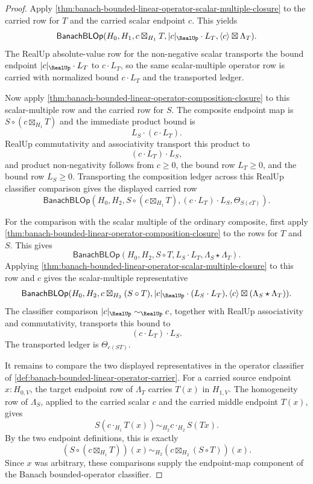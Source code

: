 \begin{proof}
Apply \autoref{thm:banach-bounded-linear-operator-scalar-multiple-closure} to
the carried row for $T$ and the carried scalar endpoint $c$. This yields
$$
\mathsf{BanachBLOp}
(H_0,H_1,c\boxtimes_{H_1}T,|c|_{\RealUp}\cdot L_T,
\langle c\rangle\boxtimes\Lambda_T).
$$
The RealUp absolute-value row for the non-negative scalar transports the bound
endpoint $|c|_{\RealUp}\cdot L_T$ to $c\cdot L_T$, so the same scalar-multiple
operator row is carried with normalized bound $c\cdot L_T$ and the transported
ledger.

Now apply \autoref{thm:banach-bounded-linear-operator-composition-closure} to
this scalar-multiple row and the carried row for $S$. The composite endpoint
map is $S\circ(c\boxtimes_{H_1}T)$ and the immediate product bound is
$$
L_S\cdot(c\cdot L_T).
$$
RealUp commutativity and associativity transport this product to
$$
(c\cdot L_T)\cdot L_S,
$$
and product non-negativity follows from $c\ge0$, the bound row $L_T\ge0$, and
the bound row $L_S\ge0$. Transporting the composition ledger across this
RealUp classifier comparison gives the displayed carried row
$$
\mathsf{BanachBLOp}
(H_0,H_2,S\circ(c\boxtimes_{H_1}T),(c\cdot L_T)\cdot L_S,
\Theta_{S(cT)}).
$$

For the comparison with the scalar multiple of the ordinary composite, first
apply \autoref{thm:banach-bounded-linear-operator-composition-closure} to the
rows for $T$ and $S$. This gives
$$
\mathsf{BanachBLOp}(H_0,H_2,S\circ T,L_S\cdot L_T,
\Lambda_S\star\Lambda_T).
$$
Applying \autoref{thm:banach-bounded-linear-operator-scalar-multiple-closure}
to this row and $c$ gives the scalar-multiple representative
$$
\mathsf{BanachBLOp}
(H_0,H_2,c\boxtimes_{H_2}(S\circ T),
|c|_{\RealUp}\cdot(L_S\cdot L_T),
\langle c\rangle\boxtimes(\Lambda_S\star\Lambda_T)).
$$
The classifier comparison $|c|_{\RealUp}\sim_{\RealUp}c$, together with RealUp
associativity and commutativity, transports this bound to
$$
(c\cdot L_T)\cdot L_S.
$$
The transported ledger is $\Theta_{c(ST)}$.

It remains to compare the two displayed representatives in the operator
classifier of \autoref{def:banach-bounded-linear-operator-carrier}. For a
carried source endpoint $x:H_{0,V}$, the target endpoint row of $\Lambda_T$
carries $T(x)$ in $H_{1,V}$. The homogeneity row of $\Lambda_S$, applied to
the carried scalar $c$ and the carried middle endpoint $T(x)$, gives
$$
S(c\cdot_{H_1}T(x))\sim_{H_2}c\cdot_{H_2}S(Tx).
$$
By the two endpoint definitions, this is exactly
$$
(S\circ(c\boxtimes_{H_1}T))(x)
\sim_{H_2}
(c\boxtimes_{H_2}(S\circ T))(x).
$$
Since $x$ was arbitrary, these comparisons supply the endpoint-map component
of the Banach bounded-operator classifier.


\end{proof}
